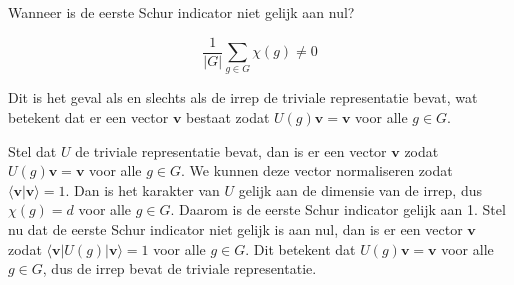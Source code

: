 \begin{derivation}
    Wanneer is de eerste Schur indicator niet gelijk aan nul?

    \[
    \frac{1}{|G|} \sum_{g \in G} \chi(g) \neq 0
    \]

    Dit is het geval als en slechts als de irrep de triviale representatie bevat,
    wat betekent dat er een vector \(\bm v\) bestaat zodat \(U(g)\bm v = \bm v\) voor alle \(g \in G\).

    Stel dat \(U\) de triviale representatie bevat, dan is er een vector \(\bm v\) zodat \(U(g)\bm v = \bm v\) voor alle \(g \in G\). We kunnen deze vector normaliseren zodat \(\langle \bm v | \bm v \rangle = 1\). Dan is het karakter van \(U\) gelijk aan de dimensie van de irrep, dus \(\chi(g) = d\) voor alle \(g \in G\). Daarom is de eerste Schur indicator gelijk aan 1.
    Stel nu dat de eerste Schur indicator niet gelijk is aan nul, dan is er een vector \(\bm v\) zodat \(\langle \bm v | U(g) | \bm v \rangle = 1\) voor alle \(g \in G\). Dit betekent dat \(U(g)\bm v = \bm v\) voor alle \(g \in G\), dus de irrep bevat de triviale representatie.
\end{derivation}
